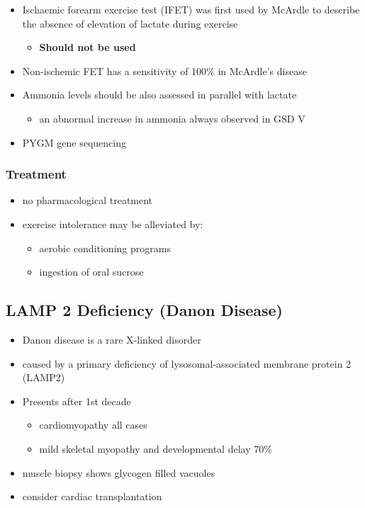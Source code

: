 \documentclass{scrartcl}
\begin{document}
\begin{itemize}
\item Ischaemic forearm exercise test (IFET) was first used by McArdle to
describe the absence of elevation of lactate during exercise
\begin{itemize}
\item \textbf{Should not be used}
\end{itemize}
\item Non-ischemic FET has a sensitivity of 100\% in McArdle’s disease
\item Ammonia levels should be also assessed in parallel with lactate
\begin{itemize}
\item an abnormal increase in ammonia always observed in GSD V
\end{itemize}
\item PYGM gene sequencing
\end{itemize}

\subsubsection{Treatment}
\label{sec:orgf427734}
\begin{itemize}
\item no pharmacological treatment
\item exercise intolerance may be alleviated by:
\begin{itemize}
\item aerobic conditioning programs
\item ingestion of oral sucrose
\end{itemize}
\end{itemize}
\subsection{LAMP 2 Deficiency (Danon Disease)}
\label{sec:org8071e06}
\begin{itemize}
\item Danon disease is a rare X-linked disorder
\item caused by a primary deficiency of lysosomal-associated membrane
protein 2 (LAMP2)
\item Presents after 1st decade
\begin{itemize}
\item cardiomyopathy all cases
\item mild skeletal myopathy and developmental delay 70\%
\end{itemize}
\item muscle biopsy shows glycogen filled vacuoles
\item consider cardiac transplantation
\end{itemize}
\end{document}

